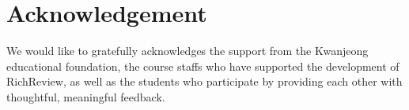 \documentclass{sigchi}
\begin{document}
\section{Acknowledgement} 
We would like to gratefully acknowledges the support from the Kwanjeong educational foundation, the course staffs who have supported the development of RichReview, as well as the students who participate by providing each other with thoughtful, meaningful feedback.



\end{document}
